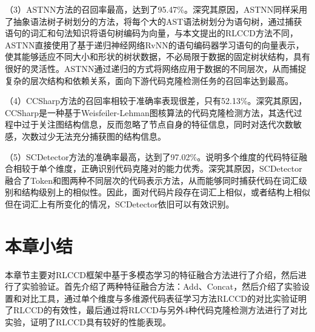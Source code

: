 （3）ASTNN方法的召回率最高，达到了95.47\%。深究其原因，ASTNN同样采用了抽象语法树子树划分的方法，将每个大的AST语法树划分为语句树，通过捕获语句的词汇和句法知识将语句树编码为向量，与本文提出的RLCCD方法不同，ASTNN直接使用了基于递归神经网络RvNN的语句编码器学习语句的向量表示，使其能够适应不同大小和形状的树状数据，不必局限于数据的固定树状结构，具有很好的灵活性。ASTNN通过递归的方式将网络应用于数据的不同层次，从而捕捉复杂的层次结构和依赖关系，面向下游代码克隆检测任务的召回率达到最高。

（4）CCSharp方法的召回率相较于准确率表现很差，只有52.13\%。深究其原因，CCSharp是一种基于Weisfeiler-Lehman图核算法的代码克隆检测方法，其迭代过程中过于关注图结构信息，反而忽略了节点自身的特征信息，同时对迭代次数敏感，次数过少无法充分捕获图的结构信息。

（5）SCDetector方法的准确率最高，达到了97.02\%。说明多个维度的代码特征融合相较于单个维度，正确识别代码克隆对的能力优秀。深究其原因，SCDetector融合了Token和图两种不同层次的代码表示方法，从而能够同时捕获代码在词汇级别和结构级别上的相似性。因此，面对代码片段存在词汇上相似，或者结构上相似但在词汇上有所变化的情况，SCDetector依旧可以有效识别。

\section{本章小结}
本章节主要对RLCCD框架中基于多模态学习的特征融合方法进行了介绍，然后进行了实验验证。首先介绍了两种特征融合方法：Add、Concat，然后介绍了实验设置和对比工具，通过单个维度与多维源代码表征学习方法RLCCD的对比实验证明了RLCCD的有效性，最后通过将RLCCD与另外4种代码克隆检测方法进行了对比实验，证明了RLCCD具有较好的性能表现。



